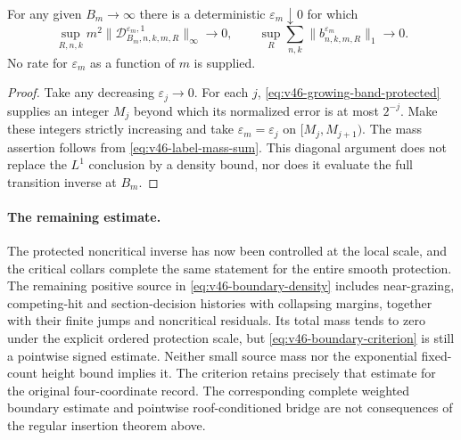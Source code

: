 \begin{corollary}
\label{cor:v46-slow-protection}
For any given $B_m\to\infty$ there is a deterministic
$\varepsilon_m\downarrow0$ for which
\[
 \sup_{R,n,k}m^2
       \|\mathscr D^{\varepsilon_m,1}_{B_m,n,k,m,R}\|_\infty\to0,
 \qquad
 \sup_R\sum_{n,k}\|b^{\varepsilon_m}_{n,k,m,R}\|_1\to0.
\]
No rate for $\varepsilon_m$ as a function of $m$ is supplied.
\end{corollary}
\begin{proof}
Take any decreasing $\varepsilon_j\to0$. For each $j$,
\eqref{eq:v46-growing-band-protected} supplies an integer $M_j$ beyond
which its normalized error is at most $2^{-j}$. Make these integers
strictly increasing and take $\varepsilon_m=\varepsilon_j$ on
$[M_j,M_{j+1})$. The mass assertion follows from
\eqref{eq:v46-label-mass-sum}. This diagonal argument does not replace
the $L^1$ conclusion by a density bound, nor does it evaluate the full
transition inverse at $B_m$.
\end{proof}

\paragraph{The remaining estimate.}
The protected noncritical inverse has now been controlled at the
local scale, and the critical collars complete the same statement for
the entire smooth protection. The remaining positive source in
\eqref{eq:v46-boundary-density} includes near-grazing, competing-hit and
section-decision histories with collapsing margins, together with their
finite jumps and noncritical residuals. Its total mass tends to zero
under the explicit ordered protection scale, but
\eqref{eq:v46-boundary-criterion} is still a pointwise signed estimate.
Neither small source mass nor the exponential fixed-count height bound
implies it. The criterion retains precisely that estimate for the
original four-coordinate record. The corresponding complete weighted
boundary estimate and pointwise roof-conditioned bridge are not
consequences of the regular insertion theorem above.
